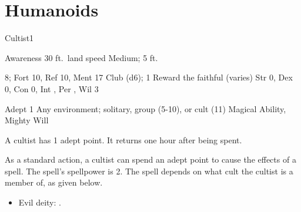 \section{Humanoids}

    \begin{monsection}{Cultist}{1}
        \begin{spellcontent}
            \begin{spelltargetinginfo}
                \pari {} Awareness 
                \pari {} 30 ft.\ land speed
                \pari {} Medium;  5 ft.
            \end{spelltargetinginfo}
            \begin{spelleffects}
                \pari {} 8;  Fort 10, Ref 10, Ment 17
                \pari {} Club  (d6);  1
                \pari {} Reward the faithful  (varies)
                \pari {} Str 0, Dex 0, Con 0, Int , Per , Wil 3
            \end{spelleffects}
        \end{spellcontent}
        \begin{spellfooter}
            \pari {} Adept 1
            \pari {} Any environment; solitary, group (5-10), or cult (11\plus)
            \pari {} Magical Ability, Mighty Will
        \end{spellfooter}
    \end{monsection}

     A cultist has 1 adept point.
    It returns one hour after being spent.

     As a standard action, a cultist can spend an adept point to cause the effects of a spell.
    The spell's spellpower is 2.
    The spell depends on what cult the cultist is a member of, as given below.
    \begin{itemize}
        \item Evil deity: .
    \end{itemize}
